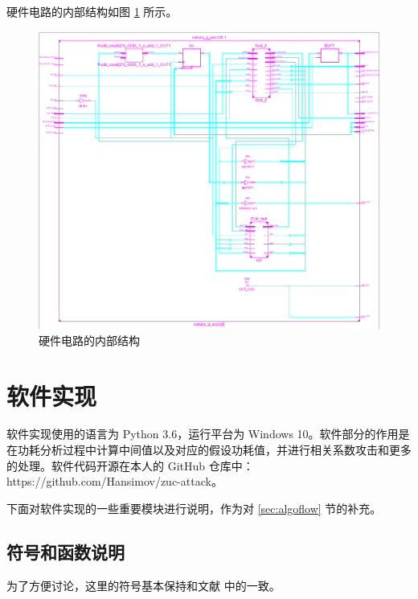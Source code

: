 \newpage

硬件电路的内部结构如图 \ref{fig:circuit_more} 所示。

\begin{figure}[htbp]
    \centering
    \includegraphics[height=.6\textheight]{../images/circuit_more.png}
    \caption{硬件电路的内部结构}
    \label{fig:circuit_more}
\end{figure}

\newpage

\section{软件实现}
\label{sec:software}

软件实现使用的语言为 Python 3.6，运行平台为 Windows 10。软件部分的作用是在功耗分析过程中计算中间值以及对应的假设功耗值，并进行相关系数攻击和更多的处理。软件代码开源在本人的 GitHub 仓库中：https://github.com/Hansimov/zuc-attack。

下面对软件实现的一些重要模块进行说明，作为对 \ref{sec:algoflow} 节的补充。


\subsection{符号和函数说明}
为了方便讨论，这里的符号基本保持和文献 \parencite{zuc_standard} 中的一致。

